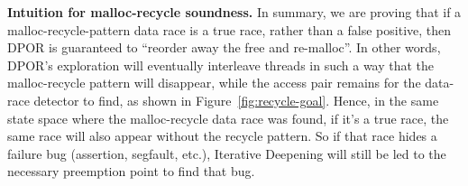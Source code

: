 {\bf Intuition for malloc-recycle soundness.}
In summary, we are proving that if a malloc-recycle-pattern data race is a true race, rather than a false positive,
then DPOR is guaranteed to ``reorder away the free and re-malloc''.
In other words, DPOR's exploration will eventually interleave threads in such a way that the malloc-recycle pattern will disappear,
while the access pair remains for the data-race detector to find, as shown in Figure~\ref{fig:recycle-goal}.
Hence, in the same state space where the malloc-recycle data race was found, if it's a true race, the same race will also appear without the recycle pattern.
So if that race hides a failure bug (assertion, segfault, etc.), Iterative Deepening will still be led to the necessary preemption point to find that bug.
